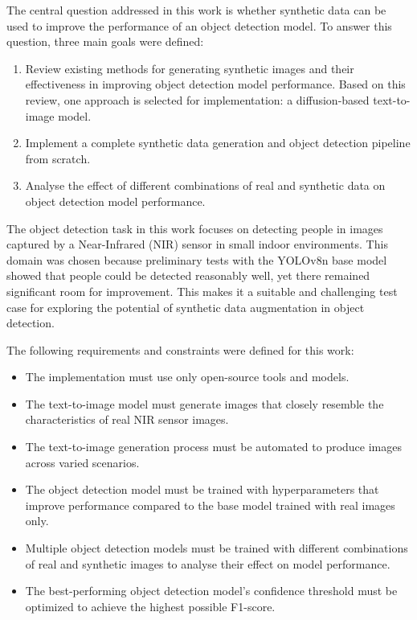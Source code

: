 The central question addressed in this work is whether synthetic data can be used to improve the performance of an object detection model. To answer this question, three main goals were defined:
\begin{enumerate}

    \item Review existing methods for generating synthetic images and their effectiveness in improving object detection model performance. Based on this review, one approach is selected for implementation: a diffusion-based text-to-image model.

    \item Implement a complete synthetic data generation and object detection pipeline from scratch.

    \item Analyse the effect of different combinations of real and synthetic data on object detection model performance.

\end{enumerate}


The object detection task in this work focuses on detecting people in images captured by a Near-Infrared (NIR) sensor in small indoor environments. This domain was chosen because preliminary tests with the YOLOv8n base model showed that people could be detected reasonably well, yet there remained significant room for improvement. This makes it a suitable and challenging test case for exploring the potential of synthetic data augmentation in object detection.

The following requirements and constraints were defined for this work:

\begin{itemize}

    \item The implementation must use only open-source tools and models.

    \item The text-to-image model must generate images that closely resemble the characteristics of real NIR sensor images.

    \item The text-to-image generation process must be automated to produce images across varied scenarios.

    \item The object detection model must be trained with hyperparameters that improve performance compared to the base model trained with real images only.

    \item Multiple object detection models must be trained with different combinations of real and synthetic images to analyse their effect on model performance.

    \item The best-performing object detection model's confidence threshold must be optimized to achieve the highest possible F1-score.

\end{itemize}

